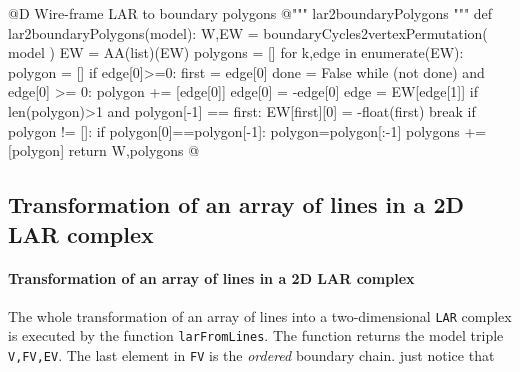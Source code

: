 \documentclass[11pt,oneside]{article}    %
\begin{document}
@D Wire-frame LAR to boundary polygons 
@{""" lar2boundaryPolygons """
def lar2boundaryPolygons(model):
    W,EW = boundaryCycles2vertexPermutation( model )
    EW = AA(list)(EW)
    polygons = []
    for k,edge in enumerate(EW):
        polygon = []
        if edge[0]>=0:
            first = edge[0]
            done = False
        while (not done) and edge[0] >= 0:
            polygon += [edge[0]]
            edge[0] = -edge[0]
            edge = EW[edge[1]]
            if len(polygon)>1 and polygon[-1] == first: 
                EW[first][0] = -float(first)
                break 
        if polygon != []: 
            if polygon[0]==polygon[-1]: polygon=polygon[:-1]
            polygons += [polygon]
    return W,polygons
@}       




\subsection{Transformation of an array of lines in a 2D LAR complex}

\paragraph{Transformation of an array of lines in a 2D LAR complex}

The whole transformation of an array of lines into a two-dimensional \texttt{LAR} complex is executed by the function \texttt{larFromLines}. The function returns the model triple \texttt{V,FV,EV}. The last element in \texttt{FV} is the \emph{ordered} boundary chain. just notice that 

\end{document}
